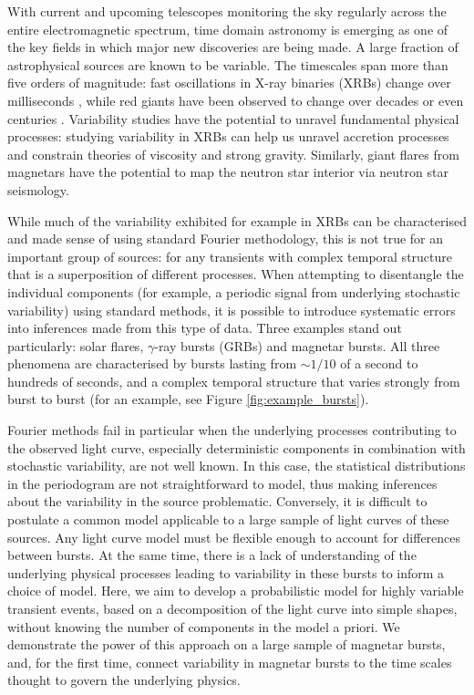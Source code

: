 \documentclass[12pt]{emulateapj}
\begin{document}
With current and upcoming telescopes monitoring the sky regularly across the entire electromagnetic spectrum, time domain astronomy is emerging as one of the key fields in which major 
new discoveries are being made.  A large fraction of astrophysical sources are known to be variable. The timescales span more than five orders of magnitude: fast oscillations in 
X-ray binaries (XRBs) change over milliseconds \citep[e.g.][]{xrb_khzqpos}, while red giants have been observed to change over decades or even centuries \citep[e.g.][]{dasch_giants}. 
Variability studies have the potential to unravel fundamental physical processes: studying variability in XRBs can help us unravel accretion processes and constrain theories of viscosity and strong gravity. 
Similarly, giant flares from magnetars have the potential to map the neutron star interior via neutron star seismology. 

While much of the variability exhibited for example in XRBs can be characterised and made sense of using standard Fourier methodology, this is not true for an important group of sources: for any transients 
with complex temporal structure that is a superposition of different processes. When attempting to disentangle the individual components (for example, a periodic signal from underlying stochastic variability)
using standard methods, it is possible to introduce systematic errors into inferences made from this type of data. Three examples stand out particularly: solar flares, $\gamma$-ray bursts (GRBs) and magnetar bursts.  All three phenomena are characterised by bursts lasting from $\sim 1/10$ of a second to hundreds of seconds, and a 
complex temporal structure that varies strongly from burst to burst (for an example, see Figure \ref{fig:example_bursts}). 

Fourier methods fail in particular when the underlying processes contributing to the observed light curve, especially deterministic 
components in combination with stochastic variability, are not well known. In this case,
the statistical distributions in the periodogram are not straightforward to model, thus making inferences about the variability in the source problematic. Conversely, 
it is difficult to postulate a common model applicable to a large sample of light curves of these sources. Any light curve model must be flexible enough to account for differences between bursts. 
At the same time, there is a lack of understanding of the underlying physical processes leading to variability in these bursts to inform a choice of model. Here, we aim to develop a probabilistic 
model for highly variable transient events, based on a decomposition of the light curve into simple shapes, without knowing the number of components in the model a priori. We demonstrate the 
power of this approach on a large sample of magnetar bursts, and, for the first time, connect variability in magnetar bursts to the time scales thought to govern the underlying physics.
\end{document}
